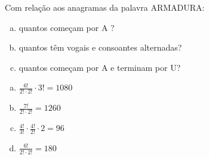 \begin{ex}
Com relação aos anagramas da palavra ARMADURA:
   \begin{enumerate}[(a)]
   \item quantos começam por A ?
   \item quantos têm vogais e consoantes alternadas?
   \item quantos começam por A e terminam por U?
   \end{enumerate}
     \begin{sol}
       \phantom{A}
        \begin{enumerate} [(a)]
            \item $\frac{6!}{2!\cdot2!}\cdot3!=1080$
            \item $\frac{7!}{2!\cdot2!}= 1260$ 
            \item $\frac{4!}{3!}\cdot\frac{4!}{2!}\cdot2=96$
            \item $\frac{6!}{2!\cdot2!}=180$
        \end{enumerate}
     \end{sol}
\end{ex}